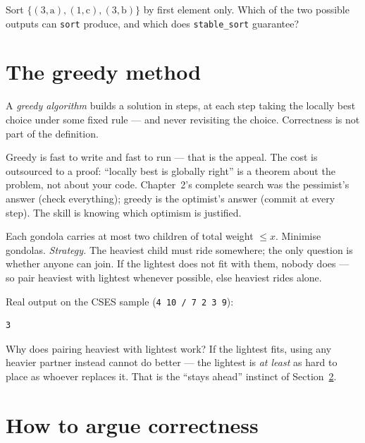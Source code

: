 \begin{exercise}[easy]
Sort $\{(3,\text{a}),(1,\text{c}),(3,\text{b})\}$ by first element only.
Which of the two possible outputs can \texttt{sort} produce, and which
does \texttt{stable\_sort} guarantee?
\end{exercise}

\section{The greedy method}
\label{sec:greedy}

\begin{definition}
A \emph{greedy algorithm} builds a solution in steps, at each step taking
the locally best choice under some fixed rule --- and never revisiting
the choice. Correctness is not part of the definition.
\end{definition}

Greedy is fast to write and fast to run --- that is the appeal. The cost
is outsourced to a proof: ``locally best is globally right'' is a theorem
about the problem, not about your code. Chapter~2's complete search was
the pessimist's answer (check everything); greedy is the optimist's
answer (commit at every step). The skill is knowing which optimism is
justified.

\begin{example}
Each gondola carries at most two children of total weight $\le x$.
Minimise gondolas. \emph{Strategy.} The heaviest child must ride
somewhere; the only question is whether anyone can join. If the lightest
does not fit with them, nobody does --- so pair heaviest with lightest
whenever possible, else heaviest rides alone.
\end{example}

Real output on the CSES sample (\texttt{4 10 / 7 2 3 9}):
\begin{lstlisting}[numbers=none]
3
\end{lstlisting}
Why does pairing heaviest with lightest work? If the lightest fits,
using any heavier partner instead cannot do better --- the lightest is
\emph{at least} as hard to place as whoever replaces it. That is the
``stays ahead'' instinct of Section~\ref{sec:proofs}.

\section{How to argue correctness}
\label{sec:proofs}

